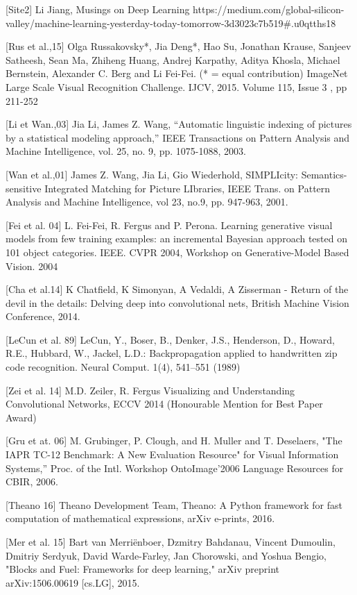 [Site2] Li Jiang, Musings on Deep Learning https://medium.com/global-silicon-valley/machine-learning-yesterday-today-tomorrow-3d3023c7b519\#.u0qtths18


[Rus et al.,15] Olga Russakovsky*, Jia Deng*, Hao Su, Jonathan Krause, Sanjeev Satheesh, Sean Ma, Zhiheng Huang, Andrej Karpathy, Aditya Khosla, Michael Bernstein, Alexander C. Berg and Li Fei-Fei. (* = equal contribution) ImageNet Large Scale Visual Recognition Challenge. IJCV, 2015. Volume 115, Issue 3 , pp 211-252 

[Li et Wan.,03] Jia Li, James Z. Wang, ``Automatic linguistic indexing of pictures by a statistical modeling approach,'' IEEE Transactions on Pattern Analysis and Machine Intelligence, vol. 25, no. 9, pp. 1075-1088, 2003.

[Wan et al.,01] James Z. Wang, Jia Li, Gio Wiederhold, SIMPLIcity: Semantics-sensitive Integrated Matching for Picture LIbraries, IEEE Trans. on Pattern Analysis and Machine Intelligence, vol 23, no.9, pp. 947-963, 2001.

[Fei et al. 04] L. Fei-Fei, R. Fergus and P. Perona. Learning generative visual models from few training examples: an incremental Bayesian approach tested on 101 object categories. IEEE. CVPR 2004, Workshop on Generative-Model Based Vision. 2004

[Cha et al.14] K Chatfield, K Simonyan, A Vedaldi, A Zisserman - Return of the devil in the details: Delving deep into convolutional nets, British Machine Vision Conference, 2014.

[LeCun et al. 89] LeCun, Y., Boser, B., Denker, J.S., Henderson, D., Howard, R.E., Hubbard, W., Jackel, L.D.: Backpropagation applied to handwritten zip code recognition. Neural
Comput. 1(4), 541–551 (1989)

[Zei et al. 14] M.D. Zeiler, R. Fergus Visualizing and Understanding Convolutional Networks, ECCV 2014 (Honourable Mention for Best Paper Award)

[Gru et at. 06] M. Grubinger, P. Clough, and H. Muller and T. Deselaers, "The IAPR TC-12 Benchmark: A New Evaluation Resource" for Visual Information Systems,” Proc. of the Intl. Workshop OntoImage’2006 Language Resources for CBIR, 2006.

[Theano 16] Theano Development Team, Theano: A {Python} framework for fast computation of mathematical expressions, arXiv e-prints, 2016.

[Mer et al. 15] Bart van Merriënboer, Dzmitry Bahdanau, Vincent Dumoulin, Dmitriy Serdyuk, David Warde-Farley, Jan Chorowski, and Yoshua Bengio, "Blocks and Fuel: Frameworks for deep learning," arXiv preprint arXiv:1506.00619 [cs.LG], 2015.
